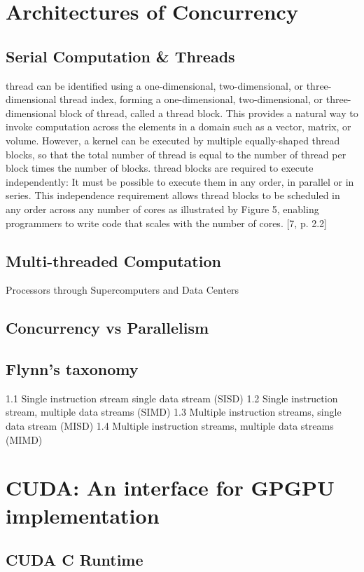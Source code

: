 \section{Architectures of Concurrency}
%
\subsection{Serial Computation \& Threads}
thread can be identified using a one-dimensional, two-dimensional, or three-
dimensional thread index, forming a one-dimensional, two-dimensional, or three-
dimensional block of thread, called a thread block. This provides a natural way
to invoke computation across the elements in a domain such as a vector, matrix,
or volume. However, a kernel can be executed by multiple equally-shaped thread
blocks, so that the total number of thread is equal to the number of thread
per block times the number of blocks. thread blocks are required to execute
independently: It must be possible to execute them in any order, in parallel or
in series. This independence requirement allows thread blocks to be scheduled
in any order across any number of cores as illustrated by Figure 5, enabling
programmers to write code that scales with the number of cores. [7, p. 2.2]
%
\subsection{Multi-threaded Computation}
Processors through Supercomputers and Data Centers
%
\subsection{Concurrency vs Parallelism}
%
\subsection{Flynn's taxonomy}
1.1	Single instruction stream single data stream (SISD)
1.2	Single instruction stream, multiple data streams (SIMD)
1.3	Multiple instruction streams, single data stream (MISD)
1.4	Multiple instruction streams, multiple data streams (MIMD)
%
\section{CUDA: An interface for GPGPU implementation}
\subsection{CUDA C Runtime}%

